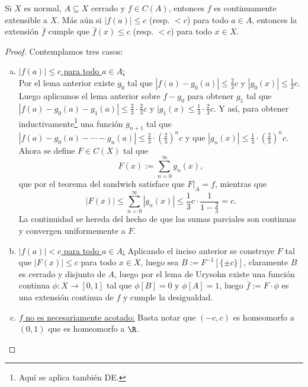 \documentclass[topologia-analisis.tex]{subfiles}
\begin{document}
\begin{thm}
	Si $X$ es normal, $A\subseteq X$ cerrado y $f \in C(A)$, entonces $f$ es continuamente extensible a $X$.
	Más aún si $|f(a)| \le c$ (resp. $<c$) para todo $a\in A$, entonces la extensión $\bar f$ cumple que $\bar f(x) \le c$ (resp. $<c$) para todo $x\in X$.
\end{thm}
\begin{proof}
	Contemplamos tres casos:
	\begin{enumerate}[a)]
		\item \underline{$|f(a)|\le c$ para todo $a\in A$:}
			\\
			Por el lema anterior existe $g_0$ tal que $|f(a) - g_0(a)| \le \frac{2}{3}c$ y $|g_0(x)| \le \frac{1}{3}c$.
			Luego aplicamos el lema anterior sobre $f - g_0$ para obtener $g_1$ tal que $|f(a) - g_0(a) - g_1(a)| \le \frac{2}{3}\cdot \frac{2}{3}c$ y $|g_1(x) \le \frac{1}{3}\cdot \frac{2}{3}c$.
			Y así, para obtener inductivamente\footnote{Aquí se aplica también DE.} una función $g_{n+1}$ tal que $|f(a) - g_0(a) - \cdots - g_n(a)| \le \frac{2}{3}\cdot \left(\frac{2}{3}\right)^n c$ y que $|g_n(x)| \le \frac{1}{3}\cdot \left(\frac{2}{3}\right)^n c$.
			\\
			Ahora se define $F \in C(X)$ tal que
			$$ F(x) := \sum_{n=0}^\infty g_n(x), $$
			que por el teorema del sandwich satisface que $F|_A = f$, mientras que
			$$ |F(x)| \le \sum_{n=0}^\infty |g_n(x)| \le \frac{1}{3}c \cdot \frac{1}{1 - \frac{2}{3}} = c. $$
			La continuidad se hereda del hecho de que las sumas parciales son continuas y convergen uniformemente a $F$.

		\item \underline{$|f(a)|<c$ para todo $a\in A$:}
			Aplicando el inciso anterior se construye $F$ tal que $|F(x)| \le c$ para todo $x\in X$, luego sea $B := F^{-1}[\{\pm c\}]$, claramente $B$ es cerrado y disjunto de $A$, luego por el lema de Urysohn existe una función continua $\phi:X \to [0,1]$ tal que $\phi[B] = 0$ y $\phi[A] = 1$, luego $\bar f := F\cdot\phi$ es una extensión continua de $f$ y cumple la desigualdad.

		\item \underline{$f$ no es necesariamente acotado:}
			Basta notar que $(-c, c)$ es homeomorfo a $(0,1)$ que es homeomorfo a $\R$. \qedhere
	\end{enumerate}
\end{proof}
\thmdep{}
\end{document}
